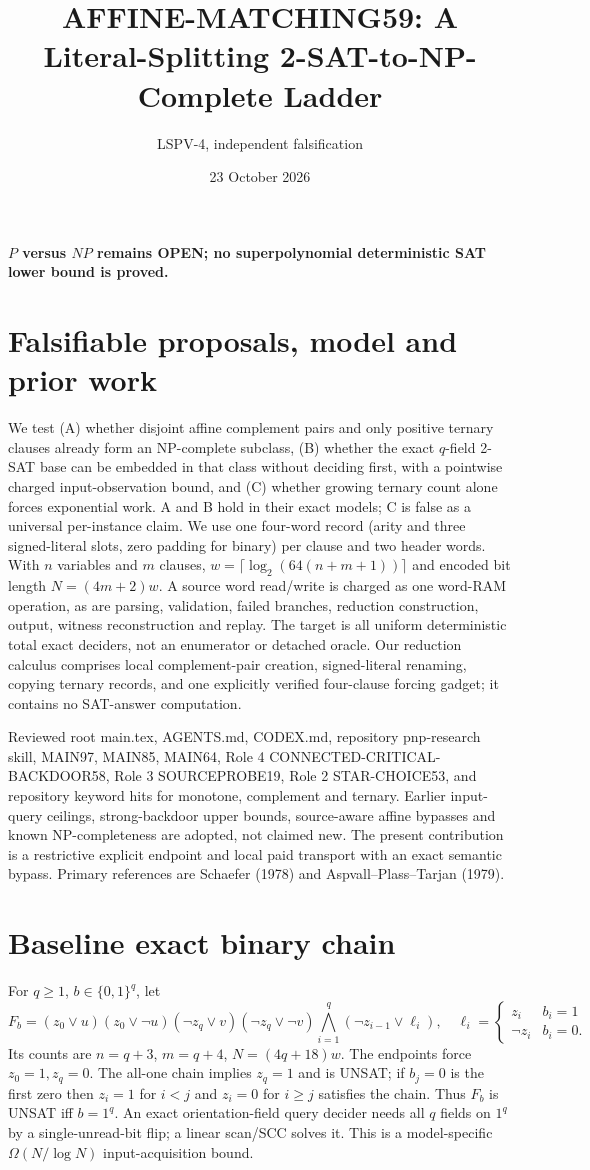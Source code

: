 \documentclass[11pt]{article}
\title{AFFINE-MATCHING59: A Literal-Splitting 2-SAT-to-NP-Complete Ladder}
\author{LSPV-4, independent falsification}
\date{23 October 2026}
\begin{document}
\maketitle
\begin{center}\textbf{$P$ versus $NP$ remains OPEN; no superpolynomial deterministic SAT lower bound is proved.}\end{center}
\section{Falsifiable proposals, model and prior work}
We test (A) whether disjoint affine complement pairs and only positive ternary clauses already form an NP-complete subclass, (B) whether the exact $q$-field 2-SAT base can be embedded in that class without deciding first, with a pointwise charged input-observation bound, and (C) whether growing ternary count alone forces exponential work. A and B hold in their exact models; C is false as a universal per-instance claim. We use one four-word record (arity and three signed-literal slots, zero padding for binary) per clause and two header words. With $n$ variables and $m$ clauses, $w=\lceil\log_2(64(n+m+1))\rceil$ and encoded bit length $N=(4m+2)w$. A source word read/write is charged as one word-RAM operation, as are parsing, validation, failed branches, reduction construction, output, witness reconstruction and replay. The target is all uniform deterministic total exact deciders, not an enumerator or detached oracle. Our reduction calculus comprises local complement-pair creation, signed-literal renaming, copying ternary records, and one explicitly verified four-clause forcing gadget; it contains no SAT-answer computation.

Reviewed root main.tex, AGENTS.md, CODEX.md, repository pnp-research skill, MAIN97, MAIN85, MAIN64, Role 4 CONNECTED-CRITICAL-BACKDOOR58, Role 3 SOURCEPROBE19, Role 2 STAR-CHOICE53, and repository keyword hits for monotone, complement and ternary. Earlier input-query ceilings, strong-backdoor upper bounds, source-aware affine bypasses and known NP-completeness are adopted, not claimed new. The present contribution is a restrictive explicit endpoint and local paid transport with an exact semantic bypass. Primary references are Schaefer (1978) and Aspvall--Plass--Tarjan (1979).
\section{Baseline exact binary chain}
For $q\ge1$, $b\in\{0,1\}^q$, let
\[
F_b=(z_0\vee u)(z_0\vee\neg u)(\neg z_q\vee v)(\neg z_q\vee\neg v)\bigwedge_{i=1}^q(\neg z_{i-1}\vee\ell_i),
\quad \ell_i=\begin{cases}z_i&b_i=1\\\neg z_i&b_i=0.\end{cases}
\]
Its counts are $n=q+3$, $m=q+4$, $N=(4q+18)w$. The endpoints force $z_0=1,z_q=0$. The all-one chain implies $z_q=1$ and is UNSAT; if $b_j=0$ is the first zero then $z_i=1$ for $i<j$ and $z_i=0$ for $i\ge j$ satisfies the chain. Thus $F_b$ is UNSAT iff $b=1^q$. An exact orientation-field query decider needs all $q$ fields on $1^q$ by a single-unread-bit flip; a linear scan/SCC solves it. This is a model-specific $\Omega(N/\log N)$ input-acquisition bound.
\end{document}
